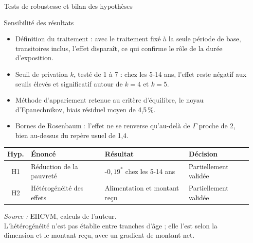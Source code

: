 \documentclass[10pt,aspectratio=169]{beamer}
\begin{document}
\begin{frame}[label=discussion-usage]{Tests de robustesse et bilan des hypothèses}
  \footnotesize
  \begin{block}{Sensibilité des résultats}
    \begin{itemize}
      \setlength{\itemsep}{1pt}
      \item Définition du traitement : avec le traitement fixé à la seule
            période de base, transitoires inclus, l'effet disparaît, ce qui
            confirme le rôle de la durée d'exposition.
      \item Seuil de privation $k$, testé de 1 à 7 : chez les 5-14 ans,
            l'effet reste négatif aux seuils élevés et significatif autour
            de $k=4$ et $k=5$.
      \item Méthode d'appariement retenue au critère d'équilibre, le noyau
            d'Epanechnikov, biais résiduel moyen de 4,5\,\%.
      \item Bornes de Rosenbaum : l'effet ne se renverse qu'au-delà de
            $\Gamma$ proche de 2, bien au-dessus du repère usuel de 1,4.
    \end{itemize}
  \end{block}

  \centering
  \renewcommand{\arraystretch}{1.35}
  \setlength{\tabcolsep}{9pt}
  \begin{tabular}{@{}clll@{}}
    \toprule
    \rowcolor{presvert!88!black}
    \color{white}Hyp. & \color{white}Énoncé & \color{white}Résultat & \color{white}Décision \\
    \midrule
    \rowcolor{presorange!16}
    H1 & Réduction de la pauvreté & -$0{,}19^{*}$ chez les 5-14 ans & Partiellement validée \\
    \rowcolor{presvert!10}
    H2 & Hétérogénéité des effets & Alimentation et montant reçu & Partiellement validée \\
    \bottomrule
  \end{tabular}
  \par\smallskip
  {\scriptsize\color{presgris}\textit{Source :} EHCVM, calculs de l'auteur.}\\
  L'hétérogénéité n'est pas établie entre tranches d'âge ;
   elle l'est selon la dimension et le montant reçu, avec un gradient de montant net.
\end{frame}
\end{document}
